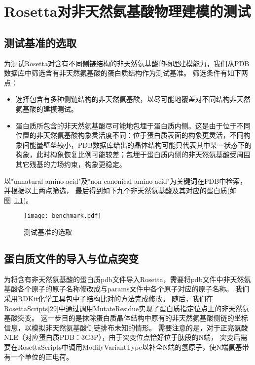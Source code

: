 
\chapter{Rosetta对非天然氨基酸物理建模的测试}



\section{测试基准的选取}

为测试Rosetta对含有不同侧链结构的非天然氨基酸的物理建模能力，我们从PDB数据库中筛选含有非天然氨基酸的蛋白质结构作为测试基准。
筛选条件有如下两点：
\begin{itemize}
  \item 选择包含有多种侧链结构的非天然氨基酸，以尽可能地覆盖对不同结构非天然氨基酸的建模测试。
  \item 蛋白质所包含的非天然氨基酸尽可能地包埋于蛋白质内侧。这是由于位于不同位置的非天然氨基酸构象灵活度不同：位于蛋白质表面的构象更灵活，不同构象间能量壁垒较小，PDB数据库给出的晶体结构可能只代表其中某一状态下的构象，此时构象恢复比例可能较差；包埋于蛋白质内侧的非天然氨基酸受周围其它残基的力场约束，构象更稳定。
\end{itemize}
以"unnatural amino acid"及"non-canonical amino acid"为关键词在PDB中检索，并根据以上两点筛选，
最后得到如下九个非天然氨基酸及其对应的蛋白质(如图~\ref{fig:benchmark})。
\begin{figure}
  \centering
  \texttt{[image: benchmark.pdf]}
  \caption{测试基准的选取}
  \label{fig:benchmark}
\end{figure}



\section{蛋白质文件的导入与位点突变}

为将含有非天然氨基酸的蛋白质pdb文件导入Rosetta，需要将pdb文件中非天然氨基酸各个原子的原子名称修改成与params文件中各个原子对应的原子名称。
我们采用RDKit化学工具包中子结构比对的方法完成修改。
随后，我们在RosettaScripts[29]中通过调用MutateResidue实现了蛋白质指定位点上的非天然氨基酸突变。
这一步目的是抹除蛋白质晶体结构中原有的非天然氨基酸侧链的坐标信息，以模拟非天然氨基酸侧链排布未知的情形。
需要注意的是，对于正亮氨酸NLE（对应蛋白质PDB：3G3P），由于突变位点恰好位于肽段的N端，
突变后需要在RosettaScripts中调用ModifyVariantType以补全N端的氢原子，使N端氨基带有一个单位的正电荷。



